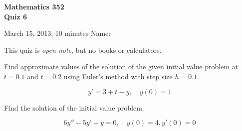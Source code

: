 \documentclass[11pt]{exam}
\begin{document}
\noindent
\textbf{{\large Mathematics 352 \\ Quiz 6}}

\noindent
March 15, 2013; 10 minutes  \hfill Name: \underline{\hspace{3in}} 

\noindent
This quiz is \emph{open-note}, but no books or calculators.

\begin{questions}  

\question Find approximate values of the solution of the given initial value problem at $t = 0.1$ and $t = 0.2$ using Euler's method with step size $h = 0.1$.

\[ y' = 3 + t - y, \quad y(0) = 1 \]


\question Find the solution of the initial value problem. 

\[ 6y'' - 5y' + y = 0, \quad y(0) = 4, y'(0) = 0 \]


\end{questions}
\end{document}
